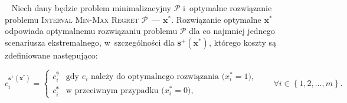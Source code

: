 \begin{theorem}\label{th:intminmaxreg2}~\cite[$432$]{minmaxSurvey}
	Niech dany będzie problem minimalizacyjny $\mathcal{P}$ i~optymalne rozwiązanie problemu \textsc{Interval Min-Max Regret $\mathcal{P}$}~--- $\textbf{x}^{\ast}$.
	Rozwiązanie optymalne $\textbf{x}^{\ast}$ odpowiada optymalnemu rozwiązaniu problemu $\mathcal{P}$ dla co najmniej jednego scenariusza ekstremalnego, w~szczególności dla $\textbf{s}^{+} \left( \textbf{x}^{\ast} \right)$, którego koszty są zdefiniowane następująco:
	
	\begin{equation}
		c^{\textbf{s}^{+} \left( \textbf{x}^{\ast} \right)}_{i} = \left\{\begin{matrix}
			c^{\underline{\textbf{s}}}_{i} & \text{gdy $e_{i}$ należy do optymalnego rozwiązania ($x^{\ast}_{i} = 1$),}\\ 
			c^{\underline{\textbf{s}}}_{i} &  \text{w przeciwnym przypadku ($x^{\ast}_{i} = 0$),}
		\end{matrix}\right. \qquad \forall i \in \left\{ 1, 2, \dots, m \right\}\text{.}
	\end{equation}
\end{theorem}

